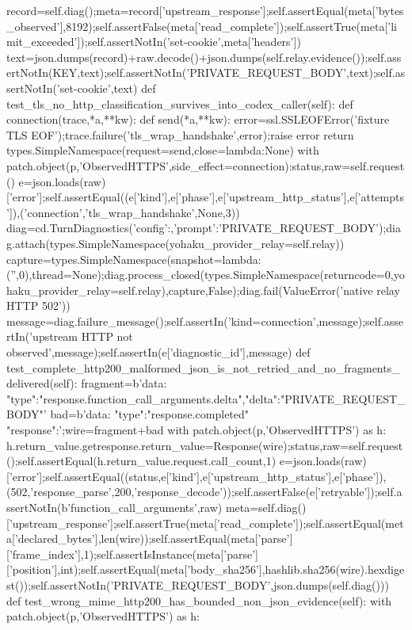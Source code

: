   record=self.diag();meta=record['upstream_response'];self.assertEqual(meta['bytes_observed'],8192);self.assertFalse(meta['read_complete']);self.assertTrue(meta['limit_exceeded']);self.assertNotIn('set-cookie',meta['headers'])
  text=json.dumps(record)+raw.decode()+json.dumps(self.relay.evidence());self.assertNotIn(KEY,text);self.assertNotIn('PRIVATE_REQUEST_BODY',text);self.assertNotIn('set-cookie',text)
 def test_tls_no_http_classification_survives_into_codex_caller(self):
  def connection(trace,*a,**kw):
   def send(*a,**kw):
    error=ssl.SSLEOFError('fixture TLS EOF');trace.failure('tls_wrap_handshake',error);raise error
   return types.SimpleNamespace(request=send,close=lambda:None)
  with patch.object(p,'ObservedHTTPS',side_effect=connection):status,raw=self.request()
  e=json.loads(raw)['error'];self.assertEqual((e['kind'],e['phase'],e['upstream_http_status'],e['attempts']),('connection','tls_wrap_handshake',None,3))
  diag=cd.TurnDiagnostics({'config':{},'prompt':'PRIVATE_REQUEST_BODY'});diag.attach(types.SimpleNamespace(yohaku_provider_relay=self.relay))
  capture=types.SimpleNamespace(snapshot=lambda:('',0),thread=None);diag.process_closed(types.SimpleNamespace(returncode=0,yohaku_provider_relay=self.relay),capture,False);diag.fail(ValueError('native relay HTTP 502'))
  message=diag.failure_message();self.assertIn('kind=connection',message);self.assertIn('upstream HTTP not observed',message);self.assertIn(e['diagnostic_id'],message)
 def test_complete_http200_malformed_json_is_not_retried_and_no_fragments_delivered(self):
  fragment=b'data: {"type":"response.function_call_arguments.delta","delta":"PRIVATE_REQUEST_BODY"}\n\n'
  bad=b'data: {"type":"response.completed" "response":{}}\n\n';wire=fragment+bad
  with patch.object(p,'ObservedHTTPS') as h:
   h.return_value.getresponse.return_value=Response(wire);status,raw=self.request();self.assertEqual(h.return_value.request.call_count,1)
  e=json.loads(raw)['error'];self.assertEqual((status,e['kind'],e['upstream_http_status'],e['phase']),(502,'response_parse',200,'response_decode'));self.assertFalse(e['retryable']);self.assertNotIn(b'function_call_arguments',raw)
  meta=self.diag()['upstream_response'];self.assertTrue(meta['read_complete']);self.assertEqual(meta['declared_bytes'],len(wire));self.assertEqual(meta['parse']['frame_index'],1);self.assertIsInstance(meta['parse']['position'],int);self.assertEqual(meta['body_sha256'],hashlib.sha256(wire).hexdigest());self.assertNotIn('PRIVATE_REQUEST_BODY',json.dumps(self.diag()))
 def test_wrong_mime_http200_has_bounded_non_json_evidence(self):
  with patch.object(p,'ObservedHTTPS') as h:
